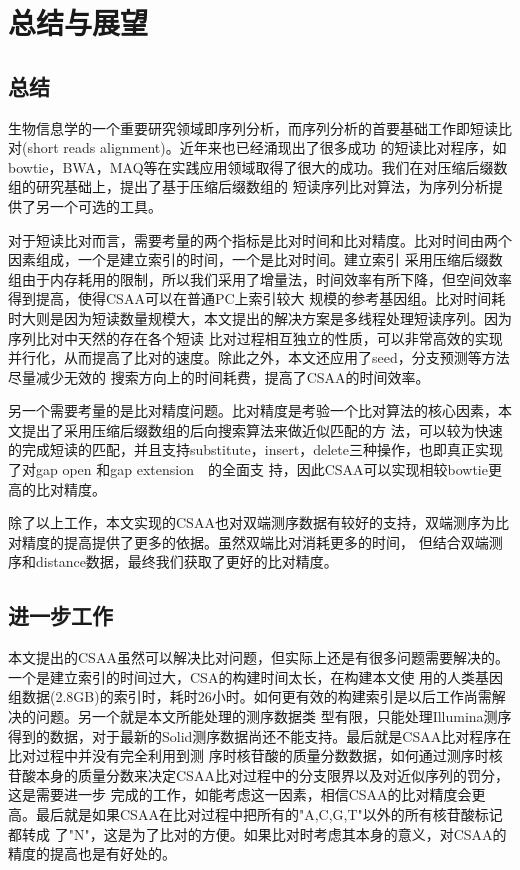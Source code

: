 \chapter{总结与展望}
\label{chap:con}

\section{总结}
生物信息学的一个重要研究领域即序列分析，而序列分析的首要基础工作即短读比对(short reads alignment)。近年来也已经涌现出了很多成功
的短读比对程序，如bowtie，BWA，MAQ等在实践应用领域取得了很大的成功。我们在对压缩后缀数组的研究基础上，提出了基于压缩后缀数组的
短读序列比对算法，为序列分析提供了另一个可选的工具。

对于短读比对而言，需要考量的两个指标是比对时间和比对精度。比对时间由两个因素组成，一个是建立索引的时间，一个是比对时间。建立索引
采用压缩后缀数组由于内存耗用的限制，所以我们采用了增量法，时间效率有所下降，但空间效率得到提高，使得CSAA可以在普通PC上索引较大
规模的参考基因组。比对时间耗时大则是因为短读数量规模大，本文提出的解决方案是多线程处理短读序列。因为序列比对中天然的存在各个短读
比对过程相互独立的性质，可以非常高效的实现并行化，从而提高了比对的速度。除此之外，本文还应用了seed，分支预测等方法尽量减少无效的
搜索方向上的时间耗费，提高了CSAA的时间效率。

另一个需要考量的是比对精度问题。比对精度是考验一个比对算法的核心因素，本文提出了采用压缩后缀数组的后向搜索算法来做近似匹配的方
法，可以较为快速的完成短读的匹配，并且支持substitute，insert，delete三种操作，也即真正实现了对gap open 和gap extension　的全面支
持，因此CSAA可以实现相较bowtie更高的比对精度。

除了以上工作，本文实现的CSAA也对双端测序数据有较好的支持，双端测序为比对精度的提高提供了更多的依据。虽然双端比对消耗更多的时间，
但结合双端测序和distance数据，最终我们获取了更好的比对精度。

\section{进一步工作}
本文提出的CSAA虽然可以解决比对问题，但实际上还是有很多问题需要解决的。一个是建立索引的时间过大，CSA的构建时间太长，在构建本文使
用的人类基因组数据(2.8GB)的索引时，耗时26小时。如何更有效的构建索引是以后工作尚需解决的问题。另一个就是本文所能处理的测序数据类
型有限，只能处理Illumina测序得到的数据，对于最新的Solid测序数据尚还不能支持。最后就是CSAA比对程序在比对过程中并没有完全利用到测
序时核苷酸的质量分数数据，如何通过测序时核苷酸本身的质量分数来决定CSAA比对过程中的分支限界以及对近似序列的罚分，这是需要进一步
完成的工作，如能考虑这一因素，相信CSAA的比对精度会更高。最后就是如果CSAA在比对过程中把所有的"A,C,G,T"以外的所有核苷酸标记都转成
了"N"，这是为了比对的方便。如果比对时考虑其本身的意义，对CSAA的精度的提高也是有好处的。
